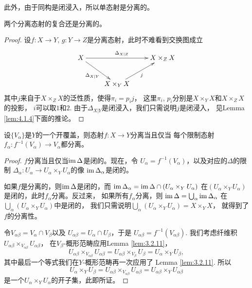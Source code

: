 此外，由于同构是闭浸入，所以单态射是分离的。

\begin{pro}
两个分离态射的复合还是分离的。
\end{pro}

\begin{proof}
设$f:X\to Y$, $g:Y\to Z$是分离态射，此时不难看到交换图成立
\[
\begin{xy}
\xymatrix{
	X \ar[rr]^{\Delta_{X|Z}}\ar[dr]_{\Delta_{X|Y}}&&X\times_Z X\\
	&X\times_Y X \ar[ur]_j&
	}
\end{xy}
\]
其中$j$来自于$X\times_Z X$的泛性质，使得$\pi_i=p_ij$，
这里$\pi_i$, $p_i$分别是$X\times_Y X$和$X\times_Z X$的投影，
$i$可以取$1$和$2$. 由于$\Delta_{X|Y}$是闭浸入，我们只需说明$j$是闭浸入，
见Lemma \ref{lem:4.1.4}下面的推论。
\end{proof}

\begin{pro}
	设$\{V_\alpha\}$是$Y$的一个开覆盖，则态射$f:X\to Y$分离当且仅当
	每个限制态射$f_\alpha:f^{-1}(V_\alpha)\to V_\alpha$都分离。
\end{pro}

\begin{proof}
	$f$分离当且仅当$\operatorname{im} \Delta$是闭的。现在，令
	$U_\alpha=f^{-1}(V_\alpha)$，以及对应的$\Delta$的限制
	$\Delta_\alpha:U_\alpha\to U_\alpha\times_Y U_\alpha$的像
	$\operatorname{im} \Delta_\alpha$是闭的。

	如果$f$是分离的，则$\operatorname{im} \Delta$是闭的，而
	$\operatorname{im} \Delta_{\alpha}=\operatorname{im} \Delta \cap (U_\alpha\times_Y U_\alpha)$
	在$(U_\alpha\times_Y U_\alpha)$是闭的，此时$f_\alpha$分离。反过来，
	如果所有$f_\alpha$分离，则
	$
	\operatorname{im} \Delta=\bigcup_\alpha \operatorname{im} \Delta_{\alpha}
	$
	在$\bigcup_\alpha (U_\alpha\times_Y U_\alpha)$中是闭的，
	我们只需说明$\bigcup_\alpha (U_\alpha\times_Y U_\alpha)=X\times_Y X$，
	就得到了$f$的分离性。

	令$V_{\alpha\beta}=V_\alpha\cap V_\beta$以及
	$U_{\alpha\beta}=U_\alpha\cap U_\beta$，于是
	$U_{\alpha\beta}=f^{-1}(V_{\alpha\beta})$. 我们考虑纤维积
	$U_{\alpha\beta}\times_{V_{\alpha\beta}}U_{\alpha\beta}$，
	在$V_\beta$-概形范畴应用Lemma \ref{lem:3.2.11}，
	\[
	U_{\alpha\beta}\times_{V_{\alpha\beta}}U_{\alpha\beta}=
	U_{\alpha\beta}\times_{V_\beta} U_\beta=U_{\alpha}\times_{Y} U_\beta,
	\]
	其中最后一个等式我们在$Y$-概形范畴再一次应用了
	Lemma \ref{lem:3.2.11}. 所以
	\[
	U_\alpha\times_Y U_\beta=U_{\alpha\beta}\times_{V_{\alpha\beta}}
	U_{\alpha\beta}=U_{\alpha\beta}\times_{Y}U_{\alpha\beta}
	\]
	是一个$U_\alpha\times_Y U_\alpha$的开子集，此即所证。
\end{proof}

